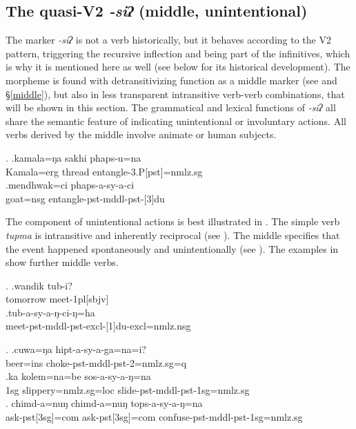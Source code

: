 \subsection{The quasi-V2 \emph{-siʔ} (middle, unintentional)}\label{V2-mddl}

The marker \emph{-siʔ} is not a verb historically, but it behaves according to the V2 pattern, triggering the recursive inflection and being part of the infinitives, which is why it is mentioned here as well (see below for its historical development). The morpheme is found with detransitivizing function as a middle  marker (see \Next and §\ref{middle}),  but also in less transparent intransitive verb-verb combinations, that will be shown in this section. The grammatical and lexical functions of  \emph{-siʔ} all share the semantic feature of indicating unintentional  or involuntary  actions. All verbs derived by the middle involve animate or human subjects.

\ex. \ag.kamala=ŋa sakhi phaps-u=na  \\
		Kamala{\sc =erg} thread entangle-{\sc 3.P[pst]=nmlz.sg}\\
 	\bg.mendhwak=ci phaps-a-sy-a-ci\\
	goat{\sc =nsg} entangle-{\sc pst-mddl-pst-[3]du}\\
	
The component of unintentional actions is best illustrated in \Next. The simple verb \emph{tupma}  is  intransitive and inherently reciprocal (see \Next[a]). The middle specifies that the event happened spontaneously and unintentionally (see \Next[b]). The examples in \NNext show further middle verbs. 
	
\ex. \ag.wandik tub-i?\\
		tomorrow meet{\sc -1pl[sbjv]}\\
 	\bg.tub-a-sy-a-ŋ-ci-ŋ=ha\\
		meet-{\sc pst-mddl-pst-excl-[1]du-excl=nmlz.nsg}\\
	
\ex. \ag.cuwa=ŋa hipt-a-sy-a-ga=na=i?\\
		beer{\sc =ins} choke-{\sc pst-mddl-pst-2=nmlz.sg=q}	\\
 	\bg.ka kolem=na=be sos-a-sy-a-ŋ=na\\
	{\sc 1sg} slippery={\sc nmlz.sg=loc} slide{\sc -pst-mddl-pst-1sg=nmlz.sg}  	\\
	\bg. chimd-a=nuŋ chimd-a=nuŋ tops-a-sy-a-ŋ=na\\
	 ask-{\sc pst[3sg]=com} ask-{\sc pst[3sg]=com} confuse{\sc -pst-mddl-pst-1sg=nmlz.sg}\\

